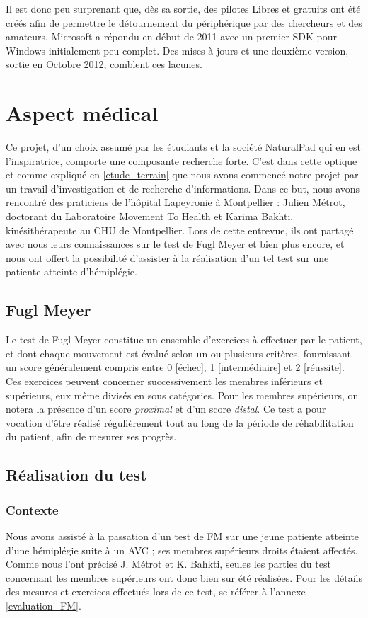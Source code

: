 \documentclass[french,12pt]{report}
\begin{document}
Il est donc peu surprenant que, dès sa sortie, des pilotes Libres et gratuits
ont été créés afin de permettre le détournement du périphérique par des
chercheurs et des amateurs. Microsoft a répondu en début de 2011 avec un
premier SDK pour Windows initialement peu complet. Des mises à jours et une
deuxième version, sortie en Octobre 2012, comblent ces lacunes.

		
		\section{Aspect médical} \label{lapeyronie}		%
Ce projet, d'un choix assumé par les étudiants et la société NaturalPad qui en est l'inspiratrice, comporte une composante recherche forte. C'est dans cette optique et comme expliqué en \ref{etude_terrain} que nous avons commencé notre projet par un travail d'investigation et de recherche d'informations. Dans ce but, nous avons rencontré des praticiens de l'hôpital Lapeyronie à Montpellier : Julien Métrot, doctorant du Laboratoire Movement To Health et Karima Bakhti, kinésithérapeute au CHU de Montpellier. Lors de cette entrevue, ils ont partagé avec nous leurs connaissances sur le test de Fugl Meyer et bien plus encore, et nous ont offert la possibilité d'assister à la réalisation d'un tel test sur une patiente atteinte d'hémiplégie.
	\subsection{Fugl Meyer}\label{fugl_meyer}
Le test de Fugl Meyer constitue un ensemble d'exercices à effectuer par le patient, et dont chaque mouvement est évalué selon un ou plusieurs critères, fournissant un score généralement compris entre 0 [échec], 1 [intermédiaire] et 2 [réussite]. Ces exercices peuvent concerner successivement les membres inférieurs et supérieurs, eux même divisés en sous catégories. Pour les membres supérieurs, on notera la présence d'un score \textit{proximal} et d'un score \textit{distal}. Ce test a pour vocation d'être réalisé régulièrement tout au long de la période de réhabilitation du patient, afin de mesurer ses progrès.
	\subsection{Réalisation du test}
				\subsubsection{Contexte}
Nous avons assisté à la passation d'un test de FM sur une jeune patiente atteinte d'une hémiplégie suite à un AVC ; ses membres supérieurs droits étaient affectés. Comme nous l'ont précisé J. Métrot et K. Bahkti, seules les parties du test concernant les membres supérieurs ont donc bien sur été réalisées. Pour les détails des mesures et exercices effectués lors de ce test, se référer à l'annexe \ref{evaluation_FM}.
\end{document}
